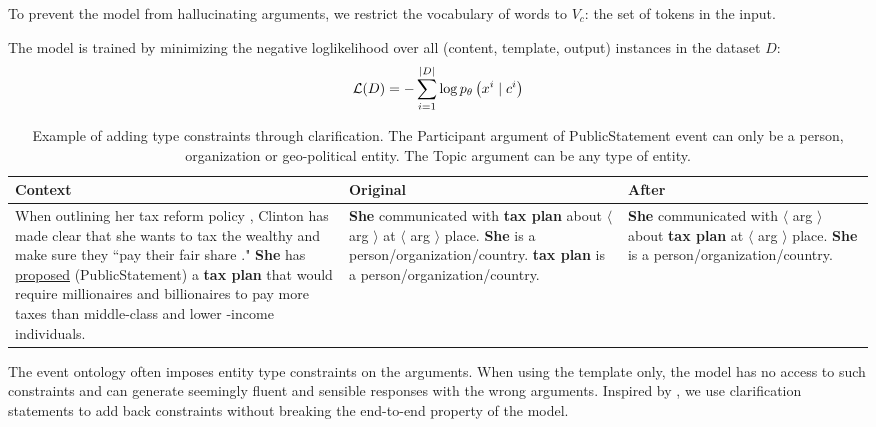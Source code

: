 To prevent the model from hallucinating arguments, we restrict the vocabulary of words to $V_c$: the set of tokens in the input.

The model is trained by minimizing the negative loglikelihood over all (content, template, output) instances in the dataset $D$:
\begin{equation}
\small 
\mathcal{L}(D)=-\sum_{i=1}^{|D|} \log p_{\theta}\left(x^i \mid c^{i} \right)
\end{equation}

\begin{table*}[t]
    \centering
    \small
    \begin{tabular}{m{23em}|m{12em}| m{10em} }
    \toprule 
    Context & Original  & After \\
    \midrule 
    When outlining her tax reform policy , Clinton has made clear that she wants to tax the wealthy and make sure they ``pay their fair share ." \textbf{She} has \underline{proposed} (PublicStatement) a \textbf{tax plan} that would require millionaires and billionaires to pay more taxes than middle-class and lower -income individuals.     &  \textbf{She} communicated with \textbf{tax plan}  about  $\langle$ arg $\rangle$ at  $\langle$ arg $\rangle$  place. {\color{red}\textbf{She } is a person/organization/country. \textbf{tax plan} is a person/organization/country.} &  \textbf{She} communicated with $\langle$ arg $\rangle$ about \textbf{tax plan} at $\langle$ arg $\rangle$ place. {\color{red}\textbf{She } is a person/organization/country. } \\
    \bottomrule 
    \end{tabular}
    \caption{Example of adding type constraints through clarification. The Participant argument of PublicStatement event can only be a person, organization or geo-political entity. The Topic argument can be any type of entity.}
    \label{tab:type-example}
\end{table*}
The event ontology often imposes entity type constraints on the arguments. When using the template only, the model has no access to such constraints and can generate seemingly fluent and sensible responses with the wrong arguments. Inspired by \cite{shwartz2020unsupervised}, we use clarification statements to add back constraints without breaking the end-to-end property of the model.

